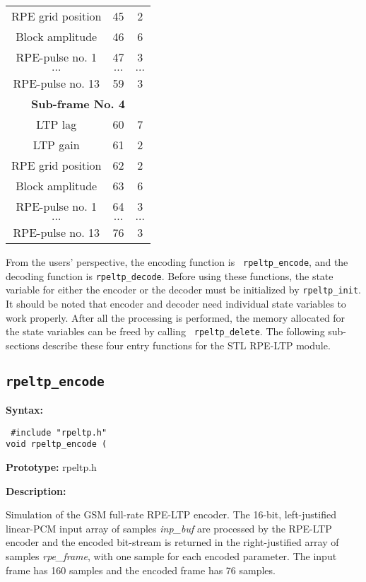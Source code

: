 \begin{table}
\begin{tabular}{|c|c|c|}
RPE grid position &45   & 2 \\
Block amplitude   &46   & 6 \\
RPE-pulse no. 1   &47   & 3 \\
$\ldots$          &$\ldots$ &$\ldots$\\
RPE-pulse no. 13  &59   & 3 \\
\hline
\multicolumn{3}{|c|}{\bf Sub-frame No. 4} \\
\hline
LTP lag           &60   & 7 \\
LTP gain          &61   & 2 \\
RPE grid position &62   & 2 \\
Block amplitude   &63   & 6 \\
RPE-pulse no. 1   &64   & 3 \\
$\ldots$          &$\ldots$ &$\ldots$\\
RPE-pulse no. 13  &76   & 3 \\
\hline
\end{tabular}
\label{RPE:bitstream}
\end{table}

From the users' perspective, the encoding function is {\tt
rpeltp\_encode}, and the decoding function is {\tt rpeltp\_decode}.
Before using these functions, the state variable for either the
encoder or the decoder must be initialized by {\tt rpeltp\_init}. It
should be noted that encoder and decoder need individual state
variables to work properly. After all the processing is performed, the
memory allocated for the state variables can be freed by calling {\tt
rpeltp\_delete}. The following sub-sections describe these four entry
functions for the STL RPE-LTP module.

\subsection{{\tt rpeltp\_encode}} \label{sec:rpeencode}

{\bf Syntax: }

{\tt
\#include "rpeltp.h"\\
void rpeltp\_encode (
}

{\bf Prototype: }    rpeltp.h

{\bf Description: }

        Simulation of the GSM full-rate RPE-LTP encoder. The 16-bit,
        left-justified linear-PCM input array of \short samples {\em
        inp\_buf} are processed by the RPE-LTP encoder and the encoded
        bit-stream is returned in the right-justified array of \short
        samples {\em rpe\_frame}, with one sample for each encoded
        parameter. The input frame has 160 samples and the encoded
        frame has 76 samples.

